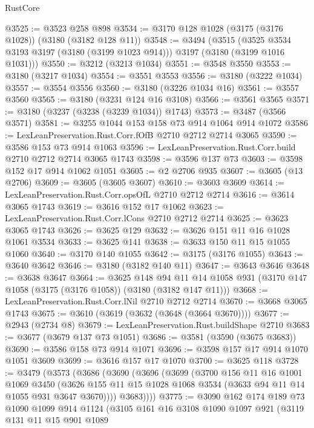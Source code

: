 \begin{lexlean}{RustCore}
\begin{coremodule}
@3525 := @3523 @258 @898
@3534 := @3170 @128 @1028 (@3175 (@3176 @1028)) (@3180 (@3182 @128 @11))
@3548 := @3494
    (@3515 (@3525 @3534 @3193 @3197 (@3180 (@3199 @1023 @914))) @3197 (@3180 (@3199 @1016 @1031)))
@3550 := @3212 (@3213 @1034)
@3551 := @3548 @3550
@3553 := @3180 (@3217 @1034)
@3554 := @3551 @3553
@3556 := @3180 (@3222 @1034)
@3557 := @3554 @3556
@3560 := @3180 (@3226 @1034 @16)
@3561 := @3557 @3560
@3565 := @3180 (@3231 @124 @16 @3108)
@3566 := @3561 @3565
@3571 := @3180 (@3237 (@3238 (@3239 @1034)) @1743)
@3573 := @3487 (@3566 @3571)
@3581 := @3255 @1044 @153 @158 @73 @914 @1064 @914 @1072
@3586 := LexLeanPreservation.Rust.Corr.fOfB @2710 @2712 @2714 @3065
@3590 := @3586 @153 @73 @914 @1063
@3596 := LexLeanPreservation.Rust.Corr.build @2710 @2712 @2714 @3065 @1743
@3598 := @3596 @137 @73
@3603 := @3598 @152 @17 @914 @1062 @1051
@3605 := @2 @2706 @935
@3607 := @3605 (@13 @2706)
@3609 := @3605 (@3605 @3607)
@3610 := @3603 @3609
@3614 := LexLeanPreservation.Rust.Corr.opsOfL @2710 @2712 @2714
@3616 := @3614 @3065 @1743
@3619 := @3616 @152 @17 @1062
@3623 := LexLeanPreservation.Rust.Corr.lCons @2710 @2712 @2714
@3625 := @3623 @3065 @1743
@3626 := @3625 @129
@3632 := @3626 @151 @11 @16 @1028 @1061 @3534
@3633 := @3625 @141
@3638 := @3633 @150 @11 @15 @1055 @1060
@3640 := @3170 @140 @1055
@3642 := @3175 (@3176 @1055)
@3643 := @3640 @3642
@3646 := @3180 (@3182 @140 @11)
@3647 := @3643 @3646
@3648 := @3638 @3647
@3664 := @3625
    @148
    @94
    @11
    @14
    @1058
    @931
    (@3170 @147 @1058 (@3175 (@3176 @1058)) (@3180 (@3182 @147 @11)))
@3668 := LexLeanPreservation.Rust.Corr.lNil @2710 @2712 @2714
@3670 := @3668 @3065 @1743
@3675 := @3610 (@3619 (@3632 (@3648 (@3664 @3670))))
@3677 := @2943 (@2734 @8)
@3679 := LexLeanPreservation.Rust.buildShape @2710
@3683 := @3677 (@3679 @137 @73 @1051)
@3686 := @3581 (@3590 (@3675 @3683))
@3690 := @3586 @158 @73 @914 @1071
@3696 := @3598 @157 @17 @914 @1070 @1051 @3609
@3699 := @3616 @157 @17 @1070
@3700 := @3625 @118
@3728 := @3479
    (@3573
      (@3686
        (@3690
          (@3696
            (@3699
              (@3700
                @156
                @11
                @16
                @1001
                @1069
                @3450
                (@3626 @155 @11 @15 @1028 @1068 @3534 (@3633 @94 @11 @14 @1055 @931 @3647 @3670))))
            @3683))))
@3775 := @3090
    @162
    @174
    @189
    @73
    @1090
    @1099
    @914
    @1124
    (@3105
      @161
      @16
      @3108
      @1090
      @1097
      @921
      (@3119
        @131
        @11
        @15
        @901
        @1089

\end{coremodule}
\end{lexlean}
